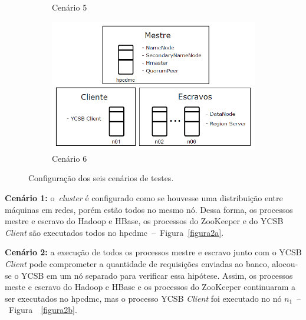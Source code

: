 \documentclass[12pt]{article}
\begin{document}
\begin{figure}
\begin{subfigure}{0.3\textwidth}
        \caption{Cenário 5}
        \label{figura2e}
    \end{subfigure}
    \begin{subfigure}{0.35\textwidth}   
    	\centering
        \includegraphics[width=1.0\textwidth]{images/cenario-6.png}
        \caption{Cenário 6}%
        \label{figura2f}
    \end{subfigure}
    \caption{Configuração dos seis cenários de testes.}
\end{figure}

\textbf{Cenário 1:} o~\emph{cluster} é configurado como se houvesse uma distribuição entre máquinas em redes, porém estão todos no mesmo nó. 
Dessa forma, os processos mestre e escravo do Hadoop e HBase, os processos do ZooKeeper e do YCSB \emph{Client} são executados todos no hpcdmc~--~Figura~\ref{figura2a}.

\textbf{Cenário 2:} a execução de todos os processos mestre e escravo junto com o YCSB \emph{Client} pode comprometer a quantidade de requisições enviadas ao banco, alocou-se o YCSB em um nó separado para verificar essa hipótese. 
Assim, os processos meste e escravo do Hadoop e HBase e os processos do ZooKeeper continuaram a ser executados no hpcdmc, mas o processo YCSB \emph{Client} foi executado no nó $n_1$~--~Figura~~\ref{figura2b}.
\end{document}
